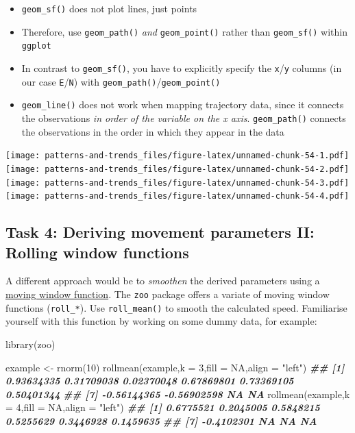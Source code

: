 \documentclass[
]{book}
\newenvironment{Shaded}{\begin{snugshade}}{\end{snugshade}}
\newcommand{\AttributeTok}[1]{\textcolor[rgb]{0.77,0.63,0.00}{#1}}
\newcommand{\ConstantTok}[1]{\textcolor[rgb]{0.00,0.00,0.00}{#1}}
\newcommand{\DecValTok}[1]{\textcolor[rgb]{0.00,0.00,0.81}{#1}}
\newcommand{\DocumentationTok}[1]{\textcolor[rgb]{0.56,0.35,0.01}{\textbf{\textit{#1}}}}
\newcommand{\FunctionTok}[1]{\textcolor[rgb]{0.00,0.00,0.00}{#1}}
\newcommand{\NormalTok}[1]{#1}
\newcommand{\OtherTok}[1]{\textcolor[rgb]{0.56,0.35,0.01}{#1}}
\newcommand{\StringTok}[1]{\textcolor[rgb]{0.31,0.60,0.02}{#1}}
\providecommand{\tightlist}{%
  \setlength{\itemsep}{0pt}\setlength{\parskip}{0pt}}
\begin{document}
\begin{itemize}
\tightlist
\item
  \texttt{geom\_sf()} does not plot lines, just points
\item
  Therefore, use \texttt{geom\_path()} \emph{and} \texttt{geom\_point()} rather than \texttt{geom\_sf()} within \texttt{ggplot}
\item
  In contrast to \texttt{geom\_sf()}, you have to explicitly specify the \texttt{x}/\texttt{y} columns (in our case \texttt{E}/\texttt{N}) with \texttt{geom\_path()}/\texttt{geom\_point()}
\item
  \texttt{geom\_line()} does not work when mapping trajectory data, since it connects the observations \emph{in order of the variable on the x axis}. \texttt{geom\_path()} connects the observations in the order in which they appear in the data
\end{itemize}

\texttt{[image: patterns-and-trends\_files/figure-latex/unnamed-chunk-54-1.pdf]} \texttt{[image: patterns-and-trends\_files/figure-latex/unnamed-chunk-54-2.pdf]} \texttt{[image: patterns-and-trends\_files/figure-latex/unnamed-chunk-54-3.pdf]} \texttt{[image: patterns-and-trends\_files/figure-latex/unnamed-chunk-54-4.pdf]}

\hypertarget{task-4-deriving-movement-parameters-ii-rolling-window-functions}{%
\subsection{Task 4: Deriving movement parameters II: Rolling window functions}\label{task-4-deriving-movement-parameters-ii-rolling-window-functions}}

A different approach would be to \emph{smoothen} the derived parameters using a \href{https://docs.wavefront.com/images/5sec_moving_window.png}{moving window function}. The \texttt{zoo} package offers a variate of moving window functions (\texttt{roll\_*}). Use \texttt{roll\_mean()} to smooth the calculated speed. Familiarise yourself with this function by working on some dummy data, for example:

\begin{Shaded}
\begin{Highlighting}[]
\FunctionTok{library}\NormalTok{(zoo)}

\NormalTok{example }\OtherTok{\textless{}{-}} \FunctionTok{rnorm}\NormalTok{(}\DecValTok{10}\NormalTok{)}
\FunctionTok{rollmean}\NormalTok{(example,}\AttributeTok{k =} \DecValTok{3}\NormalTok{,}\AttributeTok{fill =} \ConstantTok{NA}\NormalTok{,}\AttributeTok{align =} \StringTok{"left"}\NormalTok{)}
\DocumentationTok{\#\#  [1]  0.93634335  0.31709038  0.02370048  0.67869801  0.73369105  0.50401344}
\DocumentationTok{\#\#  [7] {-}0.56144365 {-}0.56902598          NA          NA}
\FunctionTok{rollmean}\NormalTok{(example,}\AttributeTok{k =} \DecValTok{4}\NormalTok{,}\AttributeTok{fill =} \ConstantTok{NA}\NormalTok{,}\AttributeTok{align =} \StringTok{"left"}\NormalTok{)}
\DocumentationTok{\#\#  [1]  0.6775521  0.2045005  0.5848215  0.5255629  0.3446928  0.1459635}
\DocumentationTok{\#\#  [7] {-}0.4102301         NA         NA         NA}
\end{Highlighting}
\end{Shaded}
\end{document}
